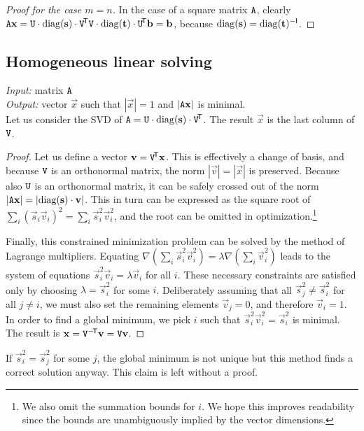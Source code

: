 \begin{proof}[Proof for the case $m = n$]
In the case of a square matrix $\mathtt{A}$, clearly
$\mathtt{A} \mathbf{x} = \mathtt{U} \cdot \mathrm{diag}(\mathbf{s}) \cdot \mathtt{V}^{\!\mathsf{T}} \mathtt{V} \cdot \mathrm{diag}(\mathbf{t}) \cdot \mathtt{U}^{\!\mathsf{T}} \mathbf{b} = \mathbf{b}$,
because $\mathrm{diag}(\mathbf{s}) = \mathrm{diag}(\mathbf{t})^{-\mathsf{I}}$.
\end{proof}

\subsection{Homogeneous linear solving}
\textit{Input:} matrix $\mathtt{A}$\\
\textit{Output:} vector $\vec x$ such that $|\vec x| = 1$ and $|\mathtt{A} \mathbf{x}|$ is minimal.\\

Let us consider the SVD of $\mathtt{A} = \mathtt{U} \cdot \mathrm{diag}(\mathbf{s}) \cdot \mathtt{V}^{\!\mathsf{T}}$.
The result $\vec x$ is the last column of $\mathtt{V}$.

\begin{proof}
Let us define a vector $\mathbf{v} = \mathtt{V}^{\!\mathsf{T}} \mathbf{x}$.
This is effectively a change of basis, and because $\mathtt{V}$ is an orthonormal matrix, the norm $|\vec v| = |\vec x|$ is preserved.
Because also $\mathtt{U}$ is an orthonormal matrix, it can be safely crossed out of the norm $|\mathtt{A} \mathbf{x}| = |\mathrm{diag}(\mathbf{s}) \cdot \mathbf{v}|$.
This in turn can be expressed as the square root of $\sum_i (\vec s_i \vec v_i)^2 = \sum_i \vec s_i^2 \vec v_i^2$, and the root can be omitted in optimization.\footnote{
We also omit the summation bounds for $i$. We hope this improves readability since the bounds are unambiguously implied by the vector dimensions.
}

Finally, this constrained minimization problem can be solved by the method of Lagrange multipliers.
Equating $\nabla(\sum_i \vec s_i^2 \vec v_i^2) = \lambda \nabla (\sum_i \vec v_i^2)$ leads to the system of equations $\vec s_i^2 \vec v_i = \lambda \vec v_i$ for all $i$.
These necessary constraints are satisfied only by choosing $\lambda = \vec s_i^2$ for some $i$.
Deliberately assuming that all $\vec s_j^2 \neq \vec s_i^2$ for all $j \neq i$, we must also set the remaining elements $\vec v_j = 0$, and therefore $\vec v_i = 1$.
In order to find a global minimum, we pick $i$ such that $\vec s_i^2 \vec v_i^2 = \vec s_i^2$ is minimal.
The result is $\mathbf{x} = \mathtt{V} ^{-\!\mathsf{T}} \mathbf{v} = \mathtt{V} \mathbf{v}$.
\end{proof}

If $\vec s_i^2 = \vec s_j^2$ for some $j$, the global minimum is not unique but this method finds a correct solution anyway.
This claim is left without a proof.

